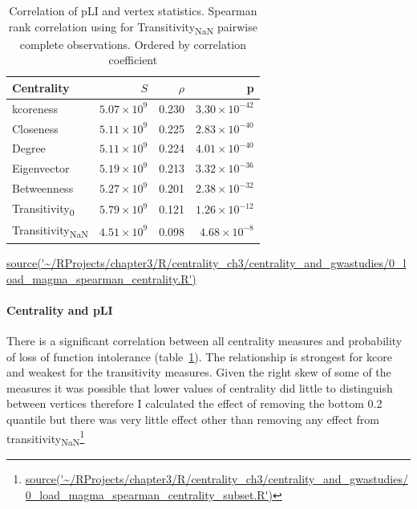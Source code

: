 \begin{table}[ht]
\centering
\setlength{\extrarowheight}{2pt}
\begin{tabular}{lrrr}
  \toprule
Centrality & $S$ & $\rho$ & p \\ 
  \midrule
kcoreness & $5.07 \times 10^{9}$ & 0.230 & $3.30 \times 10^{-42}$ \\ 
  Closeness & $5.11 \times 10^{9}$ & 0.225 & $2.83 \times 10^{-40}$ \\ 
  Degree & $5.11 \times 10^{9}$ & 0.224 & $4.01 \times 10^{-40}$ \\ 
  Eigenvector & $5.19 \times 10^{9}$ & 0.213 & $3.32 \times 10^{-36}$ \\ 
  Betweenness & $5.27 \times 10^{9}$ & 0.201 & $2.38 \times 10^{-32}$ \\ 
  Transitivity\textsubscript{0} & $5.79 \times 10^{9}$ & 0.121 & $1.26 \times 10^{-12}$ \\ 
  Transitivity\textsubscript{NaN} & $4.51 \times 10^{9}$ & 0.098 & $4.68 \times 10^{-8}$ \\ 
   \bottomrule
\end{tabular}
\caption{Correlation of pLI and vertex statistics. Spearman rank correlation using for Transitivity\textsubscript{NaN} pairwise complete observations.  Ordered by correlation coefficient}
\tiny\url{source('~/RProjects/chapter3/R/centrality_ch3/centrality_and_gwastudies/0_load_magma_spearman_centrality.R')}
\label{tab:correlation pli vertex statistics mar}
\end{table}

\paragraph{Centrality and pLI}
There is a significant correlation between all centrality measures and probability of loss of function intolerance (table~\ref{tab:correlation pli vertex statistics mar}). The relationship is strongest for kcore and weakest for the transitivity measures. Given the right skew of some of the measures it was possible that lower values of centrality did little to distinguish between vertices therefore I calculated the effect of removing the bottom 0.2 quantile but there was very little effect other than removing any effect from transitivity\textsubscript{NaN}\footnote{\url{source('~/RProjects/chapter3/R/centrality_ch3/centrality_and_gwastudies/0_load_magma_spearman_centrality_subset.R')}}


